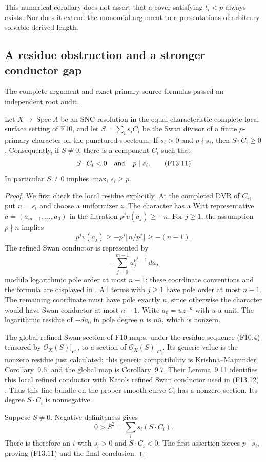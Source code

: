 This numerical corollary does not assert that a cover satisfying
$t_i<p$ always exists. Nor does it extend the monomial argument
to representations of arbitrary solvable derived length.


\subsection{A residue obstruction and a stronger conductor gap}

The complete argument and exact primary-source formulas passed an
independent root audit.

\begin{lemma}
Let $X\to\operatorname{Spec}A$ be an SNC resolution in the
equal-characteristic complete-local surface setting of F10, and
let $S=\sum_i s_iC_i$ be the Swan divisor of a finite
$p$-primary character on the punctured spectrum. If $s_i>0$
and $p\nmid s_i$, then $S\cdot C_i\geq0$. Consequently, if
$S\ne0$, there is a component $C_i$ such that
\[
                 S\cdot C_i<0\quad\hbox{and}\quad p\mid s_i.
 \tag{F13.11}
\]
In particular $S\ne0$ implies $\max_i s_i\geq p$.
\end{lemma}
\begin{proof}
We first check the local residue explicitly. At the completed
DVR of $C_i$, put $n=s_i$ and choose a uniformizer $z$.
The character has a Witt representative
$a=(a_{m-1},\ldots,a_0)$ in the filtration
$p^jv(a_j)\geq-n$. For $j\geq1$, the assumption $p\nmid n$
implies
\[
 p^jv(a_j)\geq-p^j\lfloor n/p^j\rfloor\geq-(n-1).
\]
The refined Swan conductor is represented by
\[
                  -\sum_{j=0}^{m-1}a_j^{p^j-1}\,da_j
 \tag{F13.12}
\]
modulo logarithmic pole order at most $n-1$; these coordinate
conventions and the formula are displayed in
\cite[Definition~2.1 and (2.5), pp.~8--9]{Yatagawa2017Cycle}.
All terms with $j\geq1$ have pole order at most $n-1$.
The remaining coordinate must have pole exactly $n$, since
otherwise the character would have Swan conductor at most
$n-1$. Write $a_0=uz^{-n}$ with $u$ a unit. The logarithmic
residue of $-da_0$ in pole degree $n$ is
$n\bar u$, which is nonzero.

The global refined-Swan section of F10 maps, under the residue
sequence (F10.4) tensored by $\mathcal O_X(S)|_{C_i}$, to a
section of $\mathcal O_X(S)|_{C_i}$. Its generic value is the
nonzero residue just calculated; this generic compatibility is
Krishna--Majumder, Corollary~9.6, and the global map is
Corollary~9.7. Their Lemma~9.11 identifies this local refined
conductor with Kato's refined Swan conductor used in (F13.12)
\cite[Corollaries~9.6--9.7, pp.~55--56, and Lemma~9.11,
p.~57]{KrishnaMajumder2026}.
Thus this line bundle on the proper smooth curve $C_i$ has a
nonzero section. Its degree $S\cdot C_i$ is nonnegative.

Suppose $S\ne0$. Negative definiteness gives
\[
                  0>S^2=\sum_i s_i(S\cdot C_i).
\]
There is therefore an $i$ with $s_i>0$ and $S\cdot C_i<0$.
The first assertion forces $p\mid s_i$, proving (F13.11) and
the final conclusion.
\end{proof}

